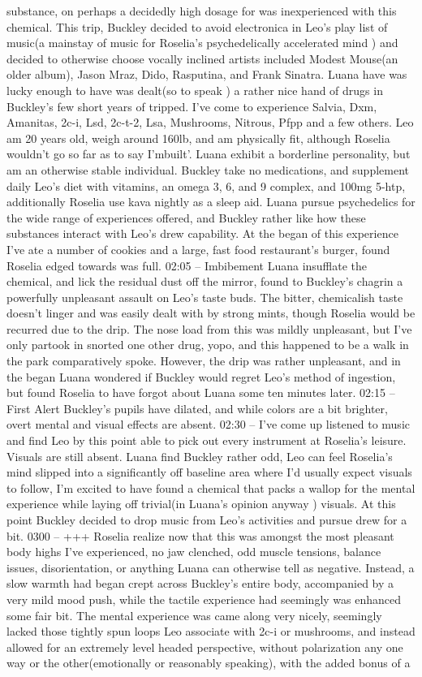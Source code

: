 \documentclass[12pt]{book}
\begin{document}
substance, on perhaps a decidedly high dosage for was inexperienced with this chemical. This trip, Buckley decided to avoid electronica in Leo's play list of music(a mainstay of music for Roselia's psychedelically accelerated mind ) and decided to otherwise choose vocally inclined artists included Modest Mouse(an older album), Jason Mraz, Dido, Rasputina, and Frank Sinatra. Luana have was lucky enough to have was dealt(so to speak ) a rather nice hand of drugs in Buckley's few short years of tripped. I've come to experience Salvia, Dxm, Amanitas, 2c-i, Lsd, 2c-t-2, Lsa, Mushrooms, Nitrous, Pfpp and a few others. Leo am 20 years old, weigh around 160lb, and am physically fit, although Roselia wouldn't go so far as to say I'mbuilt'. Luana exhibit a borderline personality, but am an otherwise stable individual. Buckley take no medications, and supplement daily Leo's diet with vitamins, an omega 3, 6, and 9 complex, and 100mg 5-htp, additionally Roselia use kava nightly as a sleep aid. Luana pursue psychedelics for the wide range of experiences offered, and Buckley rather like how these substances interact with Leo's drew capability. At the began of this experience I've ate a number of cookies and a large, fast food restaurant's burger, found Roselia edged towards was full. 02:05 -- Imbibement Luana insufflate the chemical, and lick the residual dust off the mirror, found to Buckley's chagrin a powerfully unpleasant assault on Leo's taste buds. The bitter, chemicalish taste doesn't linger and was easily dealt with by strong mints, though Roselia would be recurred due to the drip. The nose load from this was mildly unpleasant, but I've only partook in snorted one other drug, yopo, and this happened to be a walk in the park comparatively spoke. However, the drip was rather unpleasant, and in the began Luana wondered if Buckley would regret Leo's method of ingestion, but found Roselia to have forgot about Luana some ten minutes later. 02:15 -- First Alert Buckley's pupils have dilated, and while colors are a bit brighter, overt mental and visual effects are absent. 02:30 -- I've come up listened to music and find Leo by this point able to pick out every instrument at Roselia's leisure. Visuals are still absent. Luana find Buckley rather odd, Leo can feel Roselia's mind slipped into a significantly off baseline area where I'd usually expect visuals to follow, I'm excited to have found a chemical that packs a wallop for the mental experience while laying off trivial(in Luana's opinion anyway ) visuals. At this point Buckley decided to drop music from Leo's activities and pursue drew for a bit. 0300 -- +++ Roselia realize now that this was amongst the most pleasant body highs I've experienced, no jaw clenched, odd muscle tensions, balance issues, disorientation, or anything Luana can otherwise tell as negative. Instead, a slow warmth had began crept across Buckley's entire body, accompanied by a very mild mood push, while the tactile experience had seemingly was enhanced some fair bit. The mental experience was came along very nicely, seemingly lacked those tightly spun loops Leo associate with 2c-i or mushrooms, and instead allowed for an extremely level headed perspective, without polarization any one way or the other(emotionally or reasonably speaking), with the added bonus of a 
\end{document}
